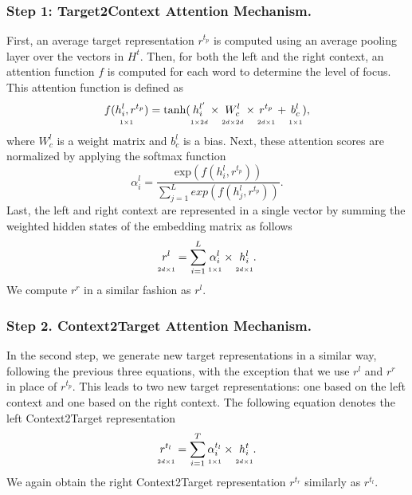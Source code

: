 \documentclass[runningheads]{llncs}
\newcommand{\undset}[2]{\underset{\scriptscriptstyle #1}{#2\strut}}
\begin{document}
\subsubsection*{Step 1: Target2Context Attention Mechanism.}
First, an average target representation $r^{t_p}$ is computed using an average pooling layer over the vectors in $H^t$. Then, for both the left and the right context, an attention function $f$ is computed for each word to determine the level of focus. This attention function is defined as
\begin{equation}
    \undset{1\times 1}{f(h_i^l, r^{t_p})}=\mathrm{tanh}(\undset{1\times 2d}{h_i^{l'}}\times \undset{2d\times 2d}{W_c^l}\times \undset{2d\times 1}{r^{t_p}}+\undset{1\times 1}{b_c^l}),
\end{equation}
where $W_c^l$ is a weight matrix and $b_c^l$ is a bias. Next, these attention scores are normalized by applying the softmax function
\begin{equation}
    \alpha_i^l=\frac{\mathrm{exp}(f(h_i^l,r^{t_p}))}{\sum^L_{j=1} exp(f(h_j^l,r^{t_p}))}.
\end{equation}
Last, the left and right context are represented in a single vector by summing the weighted hidden states of the embedding matrix as follows
\begin{equation}
    \undset{2d\times 1}{r^l}=\sum^L_{i=1} \undset{1\times 1}{\alpha_i^l}\times \undset{2d\times 1}{h_i^l}.
\end{equation}
We compute $r^r$ in a similar fashion as $r^l$.

\subsubsection*{Step 2. Context2Target Attention Mechanism.}
In the second step, we generate new target representations in a similar way, following the previous three equations, with the exception that we use $r^l$ and $r^r$ in place of $r^{t_p}$. This leads to two new target representations: one based on the left context and one based on the right context. The following equation denotes the left Context2Target representation
\begin{equation}
    \undset{2d\times 1}{r^{t_l}}=\sum_{i=1}^T \undset{1\times 1}{\alpha_i^{t_l}}\times \undset{2d\times 1}{h_i^t}.
\end{equation}
We again obtain the right Context2Target representation $r^{t_r}$ similarly as $r^{t_l}$.
\end{document}
